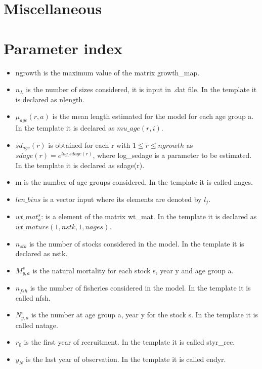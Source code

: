 \documentclass{article}
\begin{document}
\section{Miscellaneous}
\section{Parameter index}
\begin{itemize}
    \item ngrowth is the maximum value of the matrix growth\_map.
   \item $n_L$ is the number of sizes considered, it is input in .dat file. In the template it is declared as nlength.
   \item $\mu_{age}(r,a)$ is the mean length estimated for the model for each age group a. In the template it is declared as $mu\_age(r,i)$.
   \item $sd_{age}(r)$ is obtained  for each r with $1\leq r\leq ngrowth$ as $sdage(r)   = e^{log\_sdage(r)}$, where log\_sedage is a parameter to be estimated. In the template it is declared as sdage(r).
   \item m is the number of age groups considered. In the template it is called  nages.   %
   \item $len\_bins$ is a vector input where its elements are denoted by $l_j$.
    \item $wt\_mat^s_a$: is a element of the matrix wt\_mat. In the template it is declared as $wt\_mature(1,nstk,1,nages)$.
    \item $n_{stk}$ is the number of stocks considered in the model. In the template it is declared as nstk.
    \item $M^s_{y,a}$ is the natural mortality for each stock s, year y and age group a.
    \item $n_{fsh}$ is the number of fisheries considered in the model. In the template it is called nfsh.
    \item $N^s_{y,{a}}$ is the number at age group a, year y for the stock s. In the template it is called  natage.
    \item $r_0$ is the first year of recruitment. In the template it is called  styr\_rec.
    \item $y_N$ is the last year of observation. In the template it is called endyr.

\end{itemize}
\end{document}

